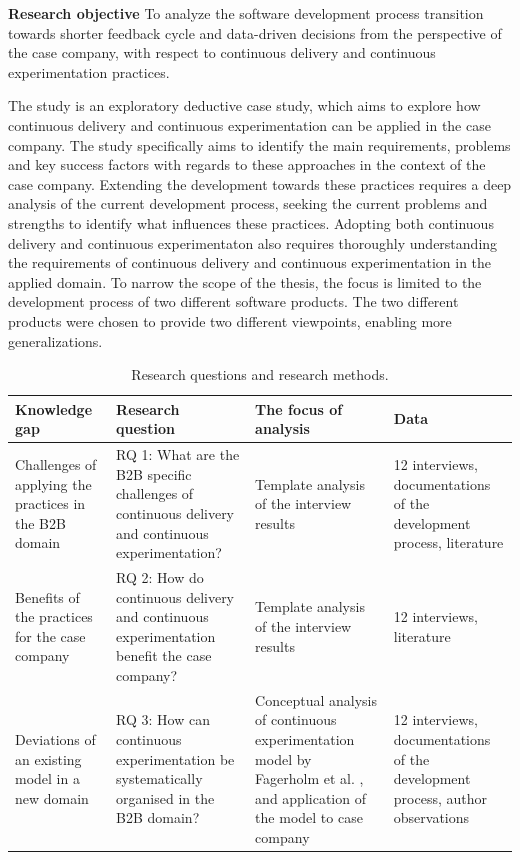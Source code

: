 \documentclass[english, grading]{tktltiki2}
\theoremstyle{definition}
\theoremstyle{remark}
\begin{document}
\bigskip
\noindent \textbf{Research objective}
To analyze the software development process transition towards shorter feedback cycle and data-driven decisions from the perspective of the case company, with respect to continuous delivery and continuous experimentation practices.

The study is an exploratory deductive case study, which aims to explore how continuous delivery and continuous experimentation can be applied in the case company. The study specifically aims to identify the main requirements, problems and key success factors with regards to these approaches in the context of the case company. Extending the development towards these practices requires a deep analysis of the current development process, seeking the current problems and strengths to identify what influences these practices. Adopting both continuous delivery and continuous experimentaton also requires thoroughly understanding the requirements of continuous delivery and continuous experimentation in the applied domain. To narrow the scope of the thesis, the focus is limited to the development process of two different software products. The two different products were chosen to provide two different viewpoints, enabling more generalizations.

\begin{center}
\begin{table}[!h]
    \begin{tabular}{ | p{2cm} | p{3cm} | p{3cm} | p{3cm} |}
    \hline
    \textbf{Knowledge gap} & \textbf{Research question} & \textbf{The focus of analysis} & \textbf{Data} \\ \hline
    Challenges of applying the practices in the B2B domain & RQ 1: What are the B2B specific challenges of continuous delivery and continuous experimentation? & Template analysis of the interview results & 12 interviews, documentations of the development process, literature \\ \hline
    Benefits of the practices for the case company & RQ 2: How do continuous delivery and continuous experimentation benefit the case company? & Template analysis of the interview results & 12 interviews, literature \\ \hline
    Deviations of an existing model in a new domain & RQ 3: How can continuous experimentation be systematically organised in the B2B domain? & Conceptual analysis of continuous experimentation model by Fagerholm et al. \cite{fagerholm2014building}, and application of the model to case company & 12 interviews, documentations of the development process, author observations \\ \hline
    \end{tabular}
    \caption{Research questions and research methods.}
    \end{table}
\end{center}
\end{document}
